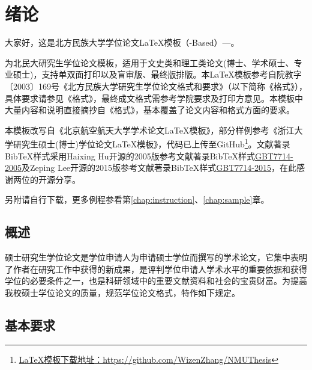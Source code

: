 \chapter{绪论}


大家好，这是北方民族大学学位论文\LaTeX{}模板（\CTeX{}-Based）---\NMUThesis{}。

\NMUThesis{}为北民大研究生学位论文模板，适用于文史类和理工类论文(博士、学术硕士、专业硕士)，支持单双面打印以及盲审版、最终版排版。本\LaTeX{}模板参考自院教字〔2003〕169号《北方民族大学研究生学位论文格式和要求》（以下简称《格式》），具体要求请参见《格式》，最终成文格式需参考学院要求及打印方意见。本模板中大量内容和说明直接摘抄自《格式》，基本覆盖了论文内容和格式方面的要求。

本模板改写自《北京航空航天大学学术论文\LaTeX{}模板》，部分样例参考《浙江大学研究生硕士(博士)学位论文\LaTeX{}模板》，代码已上传至GitHub\footnote{\href{https://github.com/WizenZhang/NMUThesis}{\LaTeX{}模板下载地址：https://github.com/WizenZhang/NMUThesis}}。文献著录BibTeX样式采用Haixing Hu开源的2005版参考文献著录BibTeX样式\href{https://github.com/Haixing-Hu/GBT7714-2005-BibTeX-Style}{GBT7714-2005}及Zeping Lee开源的2015版参考文献著录BibTeX样式\href{https://github.com/zepinglee/gbt7714-bibtex-style}{GBT7714-2015}，在此感谢两位的开源分享。

另附请自行下载，更多例程参看第\ref{chap:instruction}、\ref{chap:sample}章。

\section{概述}
硕士研究生学位论文是学位申请人为申请硕士学位而撰写的学术论文，它集中表明了作者在研究工作中获得的新成果，是评判学位申请人学术水平的重要依据和获得学位的必要条件之一，也是科研领域中的重要文献资料和社会的宝贵财富。为提高我校硕士学位论文的质量，规范学位论文格式，特作如下规定。

\section{基本要求}

